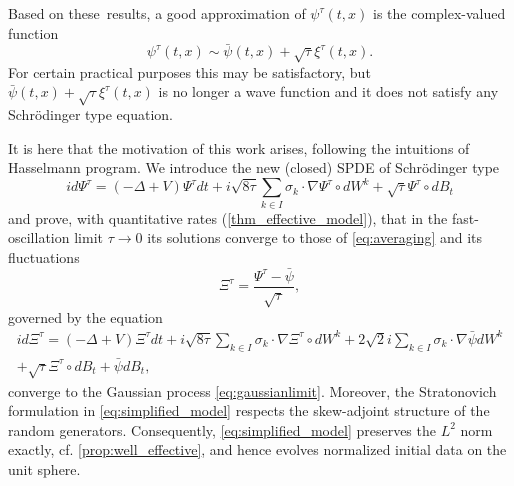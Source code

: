\documentclass[a4paper,10pt]{amsart}
\theoremstyle{remark}
\numberwithin{equation}{section}
\begin{document}
Based on these\ results, a good approximation of $\psi^{\tau}\left(
t,x\right)  $ is the complex-valued function
\begin{equation*}
    \psi^{\tau}\left(  t,x\right)  \sim\bar{\psi}\left(  t,x\right)  +\sqrt{\tau
}\xi^{\tau}\left(  t,x\right)  .
\end{equation*}
For certain practical purposes this may be satisfactory, but $\bar{\psi}\left(  t,x\right)  +\sqrt{\tau
}\xi^{\tau}\left(  t,x\right) $ is no longer a wave function and it does not satisfy any Schr\"{o}dinger type equation. 

It is here that the motivation of this work arises, following the intuitions of Hasselmann program. We introduce the new (closed) SPDE of Schr\"{o}dinger type
\begin{equation*}
id\Psi^{\tau}=(-\Delta+V)\Psi^{\tau}dt+i\sqrt{8\tau}\sum_{k\in I}\sigma
_{k}\cdot\nabla\Psi^{\tau}\circ dW^{k}+\sqrt{\tau}\Psi^{\tau}\circ
dB_{t}\tag{SSE}\label{eq:simplified_model}%
\end{equation*}
and prove, with quantitative rates (\autoref{thm_effective_model}), that in the fast-oscillation limit $\tau\rightarrow0$ its solutions converge to those of \eqref{eq:averaging} and its fluctuations
\begin{equation}
\Xi^{\tau}=\frac{\Psi^{\tau}-\bar{\psi}}{\sqrt{\tau}},%
\label{def:fluctuations2}%
\end{equation}
governed by the equation
\begin{multline}\label{eq:fluctuations2}
    i d \Xi^{\tau}=(-\Delta+V)\Xi^{\tau}dt+i\sqrt{8\tau}\sum_{k\in I}\sigma_k\cdot\nabla \Xi^{\tau}\circ dW^k +2\sqrt{2}i\sum_{k\in I}\sigma_k\cdot\nabla \bar{\psi} dW^k\\ +\sqrt{\tau} \Xi^{\tau}\circ dB_t+\bar{\psi}dB_t,
\end{multline}
converge to the Gaussian process \eqref{eq:gaussianlimit}. Moreover, the Stratonovich formulation in \eqref{eq:simplified_model} respects the skew-adjoint structure of the random generators.  Consequently,
\eqref{eq:simplified_model} preserves the $L^2$ norm exactly, cf.
\cref{prop:well_effective}, and hence evolves normalized initial data on the unit sphere.
\end{document}
